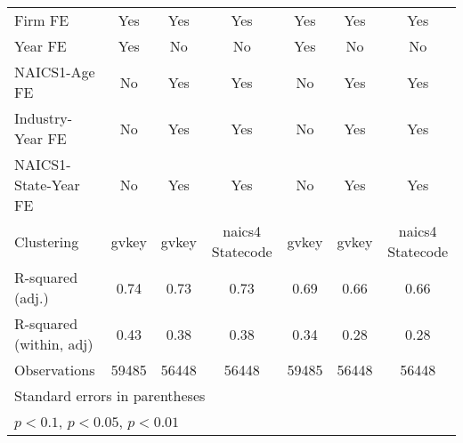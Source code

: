 {\begin{tabular}{l*{6}{c}}
\addlinespace
Firm FE             &         Yes         &         Yes         &         Yes         &         Yes         &         Yes         &         Yes         \\
\addlinespace
Year FE             &         Yes         &          No         &          No         &         Yes         &          No         &          No         \\
\addlinespace
NAICS1-Age FE       &          No         &         Yes         &         Yes         &          No         &         Yes         &         Yes         \\
\addlinespace
Industry-Year FE    &          No         &         Yes         &         Yes         &          No         &         Yes         &         Yes         \\
\addlinespace
NAICS1-State-Year FE&          No         &         Yes         &         Yes         &          No         &         Yes         &         Yes         \\
\midrule
Clustering          &       gvkey         &       gvkey         &naics4 Statecode         &       gvkey         &       gvkey         &naics4 Statecode         \\
R-squared (adj.)    &        0.74         &        0.73         &        0.73         &        0.69         &        0.66         &        0.66         \\
R-squared (within, adj)&        0.43         &        0.38         &        0.38         &        0.34         &        0.28         &        0.28         \\
Observations        &       59485         &       56448         &       56448         &       59485         &       56448         &       56448         \\
\bottomrule
\multicolumn{7}{l}{\footnotesize Standard errors in parentheses}\\
\multicolumn{7}{l}{\footnotesize \sym{*} \(p<0.1\), \sym{**} \(p<0.05\), \sym{***} \(p<0.01\)}\\
\end{tabular}
}
